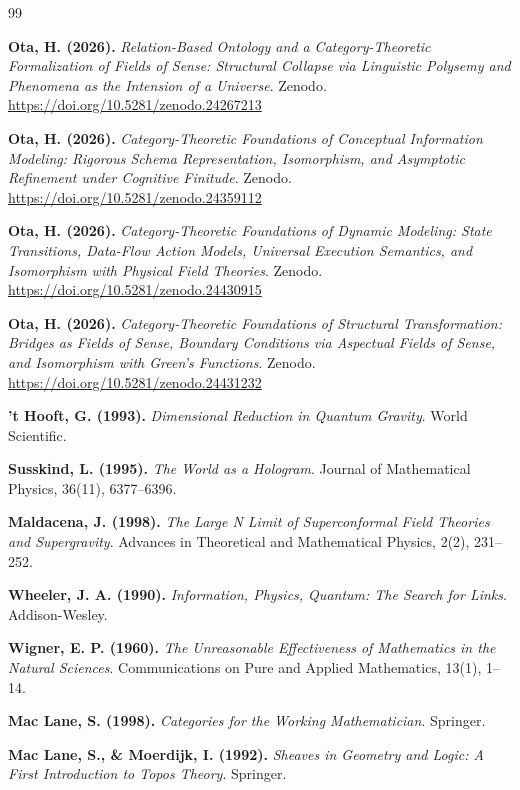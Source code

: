 \documentclass[11pt,a4paper]{article}
\theoremstyle{definition}
\theoremstyle{plain}
\begin{document}
\begin{thebibliography}{99}

\textbf{Ota, H. (2026).} \textit{Relation-Based Ontology and a Category-Theoretic Formalization of Fields of Sense: Structural Collapse via Linguistic Polysemy and Phenomena as the Intension of a Universe}. Zenodo. \url{https://doi.org/10.5281/zenodo.24267213}

\textbf{Ota, H. (2026).} \textit{Category-Theoretic Foundations of Conceptual Information Modeling: Rigorous Schema Representation, Isomorphism, and Asymptotic Refinement under Cognitive Finitude}. Zenodo. \url{https://doi.org/10.5281/zenodo.24359112}

\textbf{Ota, H. (2026).} \textit{Category-Theoretic Foundations of Dynamic Modeling: State Transitions, Data-Flow Action Models, Universal Execution Semantics, and Isomorphism with Physical Field Theories}. Zenodo. \url{https://doi.org/10.5281/zenodo.24430915}

\textbf{Ota, H. (2026).} \textit{Category-Theoretic Foundations of Structural Transformation: Bridges as Fields of Sense, Boundary Conditions via Aspectual Fields of Sense, and Isomorphism with Green's Functions}. Zenodo. \url{https://doi.org/10.5281/zenodo.24431232}

\textbf{'t Hooft, G. (1993).} \textit{Dimensional Reduction in Quantum Gravity}. World Scientific.

\textbf{Susskind, L. (1995).} \textit{The World as a Hologram}. Journal of Mathematical Physics, 36(11), 6377--6396.

\textbf{Maldacena, J. (1998).} \textit{The Large N Limit of Superconformal Field Theories and Supergravity}. Advances in Theoretical and Mathematical Physics, 2(2), 231--252.

\textbf{Wheeler, J. A. (1990).} \textit{Information, Physics, Quantum: The Search for Links}. Addison-Wesley.

\textbf{Wigner, E. P. (1960).} \textit{The Unreasonable Effectiveness of Mathematics in the Natural Sciences}. Communications on Pure and Applied Mathematics, 13(1), 1--14.

\textbf{Mac Lane, S. (1998).} \textit{Categories for the Working Mathematician}. Springer.

\textbf{Mac Lane, S., \& Moerdijk, I. (1992).} \textit{Sheaves in Geometry and Logic: A First Introduction to Topos Theory}. Springer.


\end{thebibliography}
\end{document}
